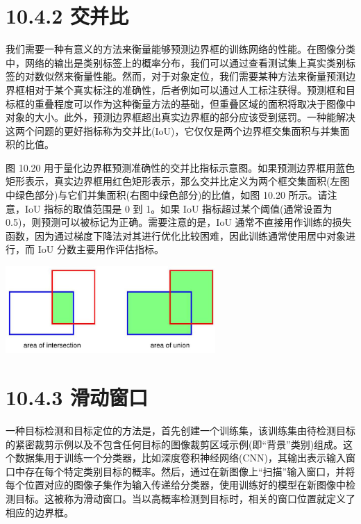 \documentclass[10pt]{article}
\begin{document}
\section*{10.4.2 交并比}

我们需要一种有意义的方法来衡量能够预测边界框的训练网络的性能。在图像分类中，网络的输出是类别标签上的概率分布，我们可以通过查看测试集上真实类别标签的对数似然来衡量性能。然而，对于对象定位，我们需要某种方法来衡量预测边界框相对于某个真实标注的准确性，后者例如可以通过人工标注获得。预测框和目标框的重叠程度可以作为这种衡量方法的基础，但重叠区域的面积将取决于图像中对象的大小。此外，预测边界框超出真实边界框的部分应该受到惩罚。一种能解决这两个问题的更好指标称为交并比(IoU)，它仅仅是两个边界框交集面积与并集面积的比值。

图 10.20 用于量化边界框预测准确性的交并比指标示意图。如果预测边界框用蓝色矩形表示，真实边界框用红色矩形表示，那么交并比定义为两个框交集面积(左图中绿色部分)与它们并集面积(右图中绿色部分)的比值，如图 10.20 所示。请注意，IoU 指标的取值范围是 0 到 1。如果 IoU 指标超过某个阈值(通常设置为 0.5)，则预测可以被标记为正确。需要注意的是，IoU 通常不直接用作训练的损失函数，因为通过梯度下降法对其进行优化比较困难，因此训练通常使用居中对象进行，而 IoU 分数主要用作评估指标。

\begin{center}
\includegraphics[max width=0.6\textwidth]{images/0194e279-9b28-703a-88f4-c3ac21e2010d_330_708_342_845_350_0.jpg}
\end{center}
\hspace*{3em} 

\section*{10.4.3 滑动窗口}

一种目标检测和目标定位的方法是，首先创建一个训练集，该训练集由待检测目标的紧密裁剪示例以及不包含任何目标的图像裁剪区域示例(即“背景”类别)组成。这个数据集用于训练一个分类器，比如深度卷积神经网络(CNN)，其输出表示输入窗口中存在每个特定类别目标的概率。然后，通过在新图像上“扫描”输入窗口，并将每个位置对应的图像子集作为输入传递给分类器，使用训练好的模型在新图像中检测目标。这被称为滑动窗口。当以高概率检测到目标时，相关的窗口位置就定义了相应的边界框。
\end{document}
